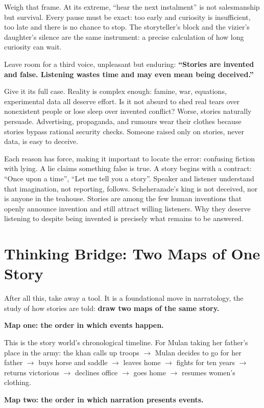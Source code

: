 Weigh that frame. At its extreme, ``hear the next instalment'' is not salesmanship but survival. Every pause must be exact: too early and curiosity is insufficient, too late and there is no chance to stop. The storyteller's block and the vizier's daughter's silence are the same instrument: a precise calculation of how long curiosity can wait.

Leave room for a third voice, unpleasant but enduring: \textbf{``Stories are invented and false. Listening wastes time and may even mean being deceived.''}

Give it its full case. Reality is complex enough: famine, war, equations, experimental data all deserve effort. Is it not absurd to shed real tears over nonexistent people or lose sleep over invented conflict? Worse, stories naturally persuade. Advertising, propaganda, and rumours wear their clothes because stories bypass rational security checks. Someone raised only on stories, never data, is easy to deceive.

Each reason has force, making it important to locate the error: confusing fiction with lying. A lie claims something false is true. A story begins with a contract: ``Once upon a time'', ``Let me tell you a story''. Speaker and listener understand that imagination, not reporting, follows. Scheherazade's king is not deceived, nor is anyone in the teahouse. Stories are among the few human inventions that openly announce invention and still attract willing listeners. Why they deserve listening to despite being invented is precisely what remains to be answered.

\section{Thinking Bridge: Two Maps of One Story}
After all this, take away a tool. It is a foundational move in narratology, the study of how stories are told: \textbf{draw two maps of the same story.}

\textbf{Map one: the order in which events happen.}

This is the story world's chronological timeline. For Mulan taking her father's place in the army: the khan calls up troops $\rightarrow$ Mulan decides to go for her father $\rightarrow$ buys horse and saddle $\rightarrow$ leaves home $\rightarrow$ fights for ten years $\rightarrow$ returns victorious $\rightarrow$ declines office $\rightarrow$ goes home $\rightarrow$ resumes women's clothing.

\textbf{Map two: the order in which narration presents events.}

